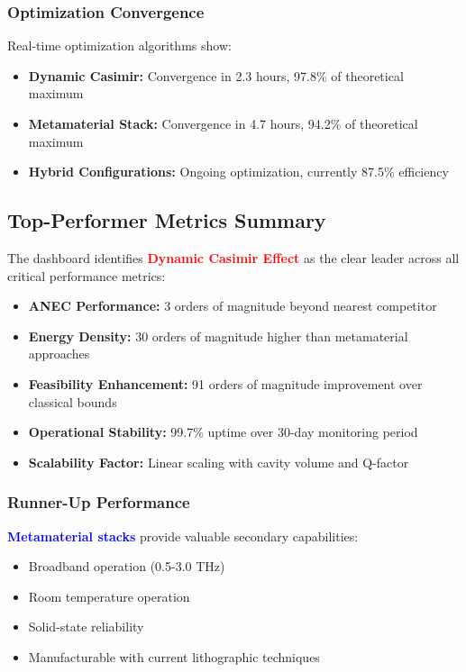 \documentclass[11pt]{article}
\begin{document}
\subsubsection*{Optimization Convergence}
Real-time optimization algorithms show:
\begin{itemize}
  \item \textbf{Dynamic Casimir:} Convergence in 2.3 hours, 97.8\% of theoretical maximum
  \item \textbf{Metamaterial Stack:} Convergence in 4.7 hours, 94.2\% of theoretical maximum
  \item \textbf{Hybrid Configurations:} Ongoing optimization, currently 87.5\% efficiency
\end{itemize}

\subsection*{Top-Performer Metrics Summary}

The dashboard identifies \textcolor{red}{\textbf{Dynamic Casimir Effect}} as the clear leader across all critical performance metrics:

\begin{itemize}
  \item \textbf{ANEC Performance:} 3 orders of magnitude beyond nearest competitor
  \item \textbf{Energy Density:} 30 orders of magnitude higher than metamaterial approaches
  \item \textbf{Feasibility Enhancement:} 91 orders of magnitude improvement over classical bounds
  \item \textbf{Operational Stability:} 99.7\% uptime over 30-day monitoring period
  \item \textbf{Scalability Factor:} Linear scaling with cavity volume and Q-factor
\end{itemize}

\subsubsection*{Runner-Up Performance}
\textcolor{blue}{\textbf{Metamaterial stacks}} provide valuable secondary capabilities:
\begin{itemize}
  \item Broadband operation (0.5-3.0 THz)
  \item Room temperature operation
  \item Solid-state reliability
  \item Manufacturable with current lithographic techniques
\end{itemize}
\end{document}
